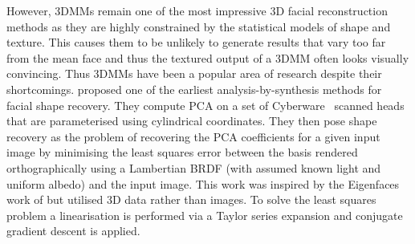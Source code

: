 However, 3DMMs remain one of the most impressive 3D facial reconstruction
methods as they are highly constrained by the statistical models
of shape and texture. This causes them to be unlikely to generate results
that vary too far from the mean face and thus the textured output of a 3DMM
often looks visually convincing. Thus 3DMMs have been a popular area of
research despite their shortcomings.
\cite{atick1996statistical} proposed one of the earliest analysis-by-synthesis
methods for facial shape recovery. They compute PCA on a set of
Cyberware~\cite{cyberware} scanned heads that are parameterised using
cylindrical coordinates. They then pose shape recovery as the problem
of recovering the PCA coefficients for a given input image by minimising
the least squares error between the basis rendered orthographically
using a Lambertian BRDF (with assumed known light and uniform albedo)
and the input image. This work was inspired by the Eigenfaces work of
\citet{Sirovich:1987te} but utilised 3D data rather than images. To solve
the least squares problem a linearisation is performed via a Taylor series 
expansion and conjugate gradient descent is applied.
